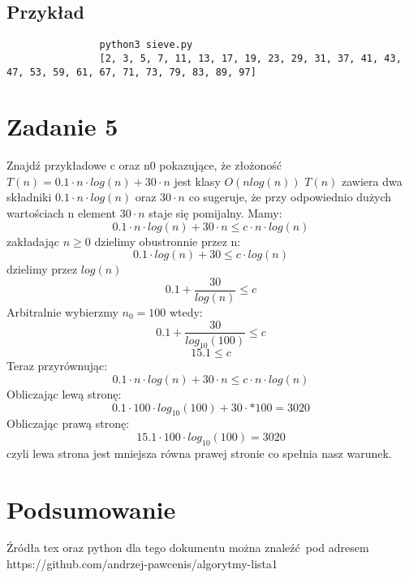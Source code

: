 \documentclass{article}
\begin{document}
		\subsection{Przykład}
			\begin{lstlisting}
				python3 sieve.py 
				[2, 3, 5, 7, 11, 13, 17, 19, 23, 29, 31, 37, 41, 43, 47, 53, 59, 61, 67, 71, 73, 79, 83, 89, 97]
			\end{lstlisting}
	\section{Zadanie 5}
			Znajdź przykładowe c oraz n0 pokazujące, że złożoność $T(n)=0.1 \cdot n \cdot log(n)+30 \cdot n$ jest klasy $O(nlog(n))$
			$T(n)$ zawiera dwa składniki $0.1 \cdot n \cdot log(n)$ oraz $30 \cdot n$ co sugeruje, że przy odpowiednio dużych wartościach n element $30 \cdot n$ staje się pomijalny.
			Mamy:
			\begin{equation}
				0.1 \cdot n \cdot log(n) + 30 \cdot n \leq c \cdot n \cdot log(n)
			\end{equation}
			zakładając $n \geq 0$ dzielimy obustronnie przez n:
			\begin{equation}
				0.1 \cdot log(n) + 30 \leq c \cdot log(n)
			\end{equation}
			dzielimy przez $log(n)$
			\begin{equation}
				0.1 + \frac{30}{log(n)} \leq c
			\end{equation}
			Arbitralnie wybierzmy $n_0=100$ wtedy:
			\begin{equation}
				0.1 + \frac{30}{log_{10}(100)} \leq c
			\end{equation}
			\begin{equation}
				15.1 \leq c
			\end{equation}
			Teraz przyrównując:
			\begin{equation}
				0.1 \cdot n \cdot log(n) + 30 \cdot n \leq c \cdot n \cdot log(n)
			\end{equation}
			Obliczając lewą stronę:
			\begin{equation}
				0.1 \cdot 100 \cdot log_{10}(100) + 30 \cdot * 100 = 3020
			\end{equation}
			Obliczając prawą stronę:
			\begin{equation}
				15.1 \cdot 100 \cdot log_{10}(100) = 3020
			\end{equation}
			czyli lewa strona jest mniejsza równa prawej stronie co spełnia nasz warunek.
	\section{Podsumowanie}
		Źródła tex oraz python dla tego dokumentu można znaleźć pod adresem https://github.com/andrzej-pawcenis/algorytmy-lista1
\end{document}
